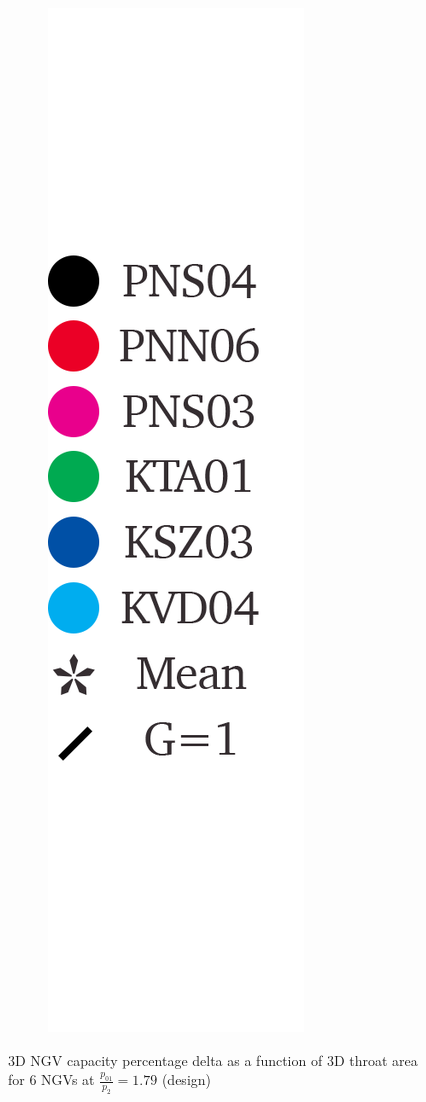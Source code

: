\documentclass[a4paper, 11pt, oneside]{report}
\begin{document}
\begin{figure}[H]
\begin{subfigure}{.1125\textwidth}
		\includegraphics[width=\linewidth]{figs/t900_throat_widths_legend.png}
	\end{subfigure}
	\caption{3D NGV capacity percentage delta as a function of 3D throat area for 6 NGVs at $\frac{p_{01}}{p_2}=1.79$ (design)}
      \label{fig:T900_2d_capacities_vs_throat_areas}
\end{figure}
\end{document}
